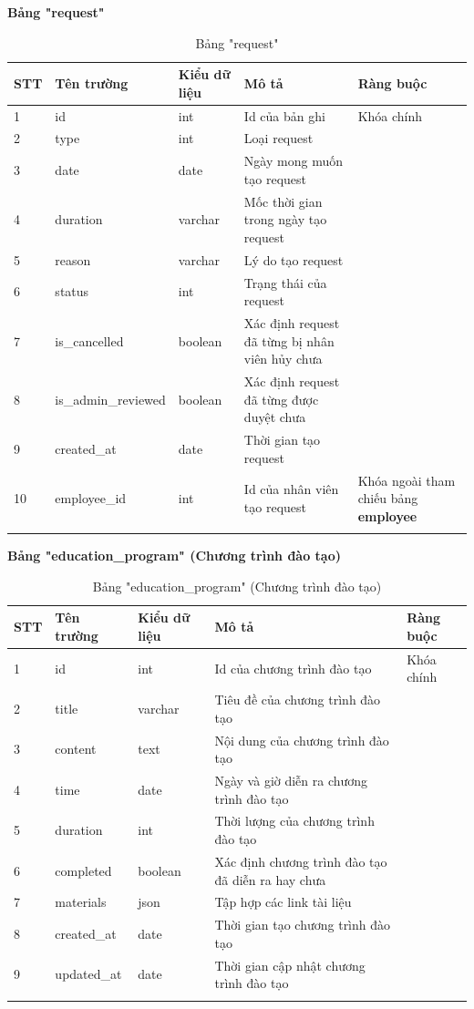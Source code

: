 \documentclass[../DoAn.tex]{subfiles}
\begin{document}
\textbf{Bảng "request"}
\begin{longtable}{|p{}|p{}|p{}|p{}|p{}|}
\hline
\textbf{STT} & \textbf{Tên trường} & \textbf{Kiểu dữ liệu} & \textbf{Mô tả } & \textbf{Ràng buộc} \\ \hline
1   & id & int & Id của bản ghi & Khóa chính \\ \hline
2   & type & int & Loại request & \\ \hline
3   & date & date & Ngày mong muốn tạo request & \\ \hline
4   & duration & varchar & Mốc thời gian trong ngày tạo request & \\ \hline
5   & reason & varchar & Lý do tạo request & \\ \hline
6   & status & int & Trạng thái của request &\\ \hline
7   & is\_cancelled & boolean & Xác định request đã từng bị nhân viên hủy chưa & \\ \hline
8   & is\_admin\_reviewed & boolean & Xác định request đã từng được duyệt chưa & \\ \hline
9   & created\_at & date & Thời gian tạo request & \\ \hline
10   & employee\_id & int & Id của nhân viên tạo request & Khóa ngoài tham chiếu bảng \textbf{employee} \\ \hline
\caption{Bảng "request"}
\end{longtable}

\textbf{Bảng "education\_program" (Chương trình đào tạo)}
\begin{longtable}{|p{}|p{}|p{}|p{}|p{}|}
\hline
\textbf{STT} & \textbf{Tên trường} & \textbf{Kiểu dữ liệu} & \textbf{Mô tả } & \textbf{Ràng buộc} \\ \hline
1   & id & int & Id của chương trình đào tạo & Khóa chính \\ \hline
2   & title & varchar & Tiêu đề của chương trình đào tạo & \\ \hline
3   & content & text & Nội dung của chương trình đào tạo & \\ \hline
4   & time & date & Ngày và giờ diễn ra chương trình đào tạo & \\ \hline
5   & duration & int & Thời lượng của chương trình đào tạo & \\ \hline
6   & completed & boolean & Xác định chương trình đào tạo đã diễn ra hay chưa & \\ \hline
7   & materials & json & Tập hợp các link tài liệu & \\ \hline
8   & created\_at & date & Thời gian tạo chương trình đào tạo & \\ \hline
9   & updated\_at & date & Thời gian cập nhật chương trình đào tạo & \\ \hline
\caption{Bảng "education\_program" (Chương trình đào tạo)}
\end{longtable}
\end{document}
